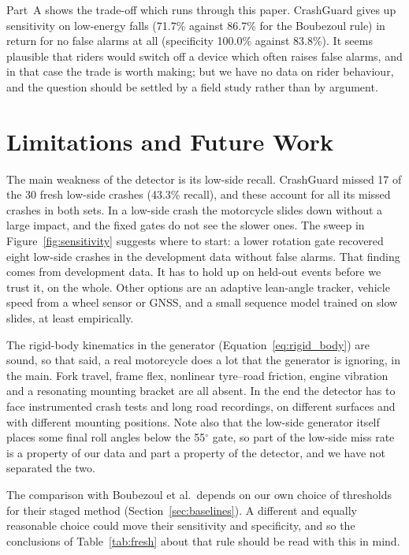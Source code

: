 \documentclass[10pt,a4paper]{article}
\newcommand{\degree}{\ensuremath{^{\circ}}}
\begin{document}
Part~A shows the trade-off which runs through this paper. CrashGuard gives up sensitivity on low-energy falls (71.7\% against 86.7\% for the Boubezoul rule) in return for no false alarms at all (specificity 100.0\% against 83.8\%). It seems plausible that riders would switch off a device which often raises false alarms, and in that case the trade is worth making; but we have no data on rider behaviour, and the question should be settled by a field study rather than by argument.

\section{Limitations and Future Work}
The main weakness of the detector is its low-side recall. CrashGuard missed 17 of the 30 fresh low-side crashes (43.3\% recall), and these account for all its missed crashes in both sets. In a low-side crash the motorcycle slides down without a large impact, and the fixed gates do not see the slower ones. The sweep in Figure~\ref{fig:sensitivity} suggests where to start: a lower rotation gate recovered eight low-side crashes in the development data without false alarms. That finding comes from development data. It has to hold up on held-out events before we trust it, on the whole. Other options are an adaptive lean-angle tracker, vehicle speed from a wheel sensor or GNSS, and a small sequence model trained on slow slides, at least empirically.

The rigid-body kinematics in the generator (Equation~\eqref{eq:rigid_body}) are sound, so that said, a real motorcycle does a lot that the generator is ignoring, in the main. Fork travel, frame flex, nonlinear tyre--road friction, engine vibration and a resonating mounting bracket are all absent. In the end the detector has to face instrumented crash tests and long road recordings, on different surfaces and with different mounting positions. Note also that the low-side generator itself places some final roll angles below the 55$\degree$ gate, so part of the low-side miss rate is a property of our data and part a property of the detector, and we have not separated the two.

The comparison with Boubezoul et al.\ depends on our own choice of thresholds for their staged method (Section~\ref{sec:baselines}). A different and equally reasonable choice could move their sensitivity and specificity, and so the conclusions of Table~\ref{tab:fresh} about that rule should be read with this in mind.
\end{document}
